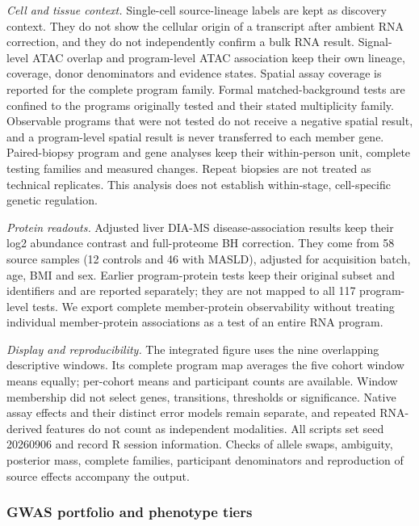 \emph{Cell and tissue context.} Single-cell source-lineage labels are kept as discovery context. They do not show the cellular origin of a transcript after ambient RNA correction, and they do not independently confirm a bulk RNA result. Signal-level ATAC overlap and program-level ATAC association keep their own lineage, coverage, donor denominators and evidence states. Spatial assay coverage is reported for the complete program family. Formal matched-background tests are confined to the programs originally tested and their stated multiplicity family. Observable programs that were not tested do not receive a negative spatial result, and a program-level spatial result is never transferred to each member gene. Paired-biopsy program and gene analyses keep their within-person unit, complete testing families and measured changes. Repeat biopsies are not treated as technical replicates. This analysis does not establish within-stage, cell-specific genetic regulation.

\emph{Protein readouts.} Adjusted liver DIA-MS disease-association results keep their log2 abundance contrast and full-proteome BH correction. They come from 58 source samples (12 controls and 46 with MASLD), adjusted for acquisition batch, age, BMI and sex. Earlier program-protein tests keep their original subset and identifiers and are reported separately; they are not mapped to all 117 program-level tests. We export complete member-protein observability without treating individual member-protein associations as a test of an entire RNA program.

\emph{Display and reproducibility.} The integrated figure uses the nine overlapping descriptive windows. Its complete program map averages the five cohort window means equally; per-cohort means and participant counts are available. Window membership did not select genes, transitions, thresholds or significance. Native assay effects and their distinct error models remain separate, and repeated RNA-derived features do not count as independent modalities. All scripts set seed 20260906 and record R session information. Checks of allele swaps, ambiguity, posterior mass, complete families, participant denominators and reproduction of source effects accompany the output.

\subsubsection{GWAS portfolio and phenotype tiers}\label{gwas-portfolio-and-phenotype-tiers}

